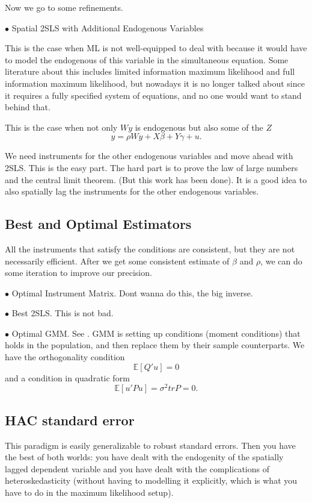 \documentclass[11pt,a4paper]{amsart}
\theoremstyle{plain}
\theoremstyle{definition}
\begin{document}
Now we go to some refinements.

$\bullet$ Spatial 2SLS with Additional Endogenous Variables

This is the case when ML is not well-equipped to deal with because it would have to model the endogenous of this variable in the simultaneous equation. Some literature about this includes limited information maximum likelihood and full information maximum likelihood, but nowadays it is no longer talked about since it requires a fully specified system of equations, and no one would want to stand behind that.

This is the case when not only $Wy$ is endogenous but also some of the $Z$
\[	y = \rho Wy + X\beta + Y\gamma + u.	\]

We need instruments for the other endogenous variables and move ahead with 2SLS. This is the easy part. The hard part is to prove the law of large numbers and the central limit theorem. (But this work has been done). It is a good idea to also spatially lag the instruments for the other endogenous variables.

\subsection{Best and Optimal Estimators}\hfill\par 
All the instruments that satisfy the conditions are consistent, but they are not necessarily efficient. After we get some consistent estimate of $\beta$ and $\rho$, we can do some iteration to improve our precision.

$\bullet$ Optimal Instrument Matrix. Dont wanna do this, the big inverse.

$\bullet$ Best 2SLS. This is not bad.

$\bullet$ Optimal GMM. See \textcite{leeEfficientGMMEstimation2010}. GMM is setting up conditions (moment conditions) that holds in the population, and then replace them by their sample counterparts. We have the orthogonality condition 
\[	\mathbb{E}[Q'u] = 0	\]
and a condition in quadratic form
\[	\mathbb{E}[u'Pu] = \sigma^{2} tr P = 0.	\]

\subsection{HAC standard error}\hfill\par 
This paradigm is easily generalizable to robust standard errors. Then you have the best of both worlds: you have dealt with the endogenity of the spatially lagged dependent variable and you have dealt with the complications of heteroskedasticity (without having to modelling it explicitly, which is what you have to do in the maximum likelihood setup). 
\end{document}
